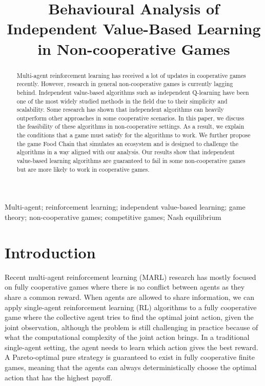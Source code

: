 \documentclass[]{interact}
\theoremstyle{plain}%
\theoremstyle{definition}
\theoremstyle{remark}
\begin{document}

\title{Behavioural Analysis of Independent Value-Based Learning in Non-cooperative Games}

\author{
}

\maketitle

\begin{abstract}
Multi-agent reinforcement learning has received a lot of updates in cooperative games recently. However, research in general non-cooperative games is currently lagging behind. Independent value-based algorithms such as independent Q-learning have been one of the most widely studied methods in the field due to their simplicity and scalability. Some research has shown that independent algorithms can heavily outperform other approaches in some cooperative scenarios. In this paper, we discuss the feasibility of these algorithms in non-cooperative settings. As a result, we explain the conditions that a game must satisfy for the algorithms to work. We further propose the game Food Chain that simulates an ecosystem and is designed to challenge the algorithms in a way aligned with our analysis. Our results show that independent value-based learning algorithms are guaranteed to fail in some non-cooperative games but are more likely to work in cooperative games.
\end{abstract}

\begin{keywords}
Multi-agent; reinforcement learning; independent value-based learning; game theory; non-cooperative games; competitive games; Nash equilibrium
\end{keywords}

\section{Introduction}
Recent multi-agent reinforcement learning (MARL) research has mostly focused on fully cooperative games \cite{yu2020benchmarking, papoudakis2020benchmarking, zhu2024survey} where there is no conflict between agents as they share a common reward. When agents are allowed to share information, we can apply single-agent reinforcement learning (RL) algorithms to a fully cooperative game where the collective agent tries to find the optimal joint action, given the joint observation, although the problem is still challenging in practice because of what the computational complexity of the joint action brings. In a traditional single-agent setting, the agent needs to learn which action gives the best reward. A Pareto-optimal pure strategy is guaranteed to exist in fully cooperative finite games, meaning that the agents can always deterministically choose the optimal action that has the highest payoff.
\end{document}
